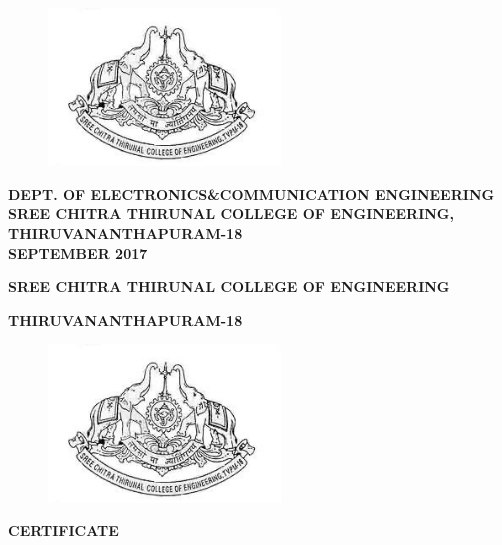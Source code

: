 \documentclass[12pt]{article}
\begin{document}
\begin{center}
    \begin{figure}[h]
    \centering
    \includegraphics[width=0.55\textwidth]{sct.jpg}
    \end{figure}
    
    \vspace{15mm}
    
    \begin{large}\textbf{
    DEPT. OF ELECTRONICS\&COMMUNICATION ENGINEERING\\SREE CHITRA THIRUNAL COLLEGE OF ENGINEERING,\\THIRUVANANTHAPURAM-18\\ \vspace{4mm} SEPTEMBER 2017}
    \end{large}
    
    
\end{center}
\newpage
{}
\begin{center}
\begin{large}
 \textbf{SREE CHITRA THIRUNAL COLLEGE OF ENGINEERING}
 \vspace{5mm}
\end{large}
\begin{Large}

 \textbf{THIRUVANANTHAPURAM-18}
\end{Large}
\begin{figure}[h]
    \centering
    \includegraphics[width=0.55\textwidth]{sct.jpg}
    
\end{figure}
\begin{LARGE}

\textbf{CERTIFICATE}\\
\end{LARGE}
 \end{center}
\end{document}
